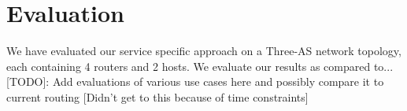 

\section{Evaluation}
\label{sec:evaluation}

We have evaluated our service specific approach on a Three-AS network 
topology, each containing 4 routers and 2 hosts. We evaluate our results
as compared to...
[TODO]: Add evaluations of various use cases here and possibly compare it to current routing 
[Didn't get to this because of time constraints]


